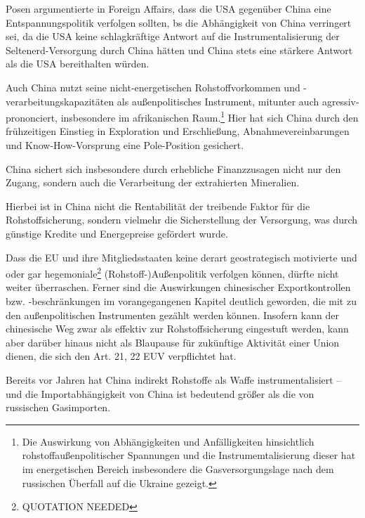 \documentclass[12pt,a4paper,oneside]{book} %
\begin{document}
{Posen argumentierte in Foreign Affairs, dass die USA gegenüber China eine Entspannungspolitik verfolgen sollten, bs die Abhängigkeit von China verringert sei, da die USA keine schlagkräftige Antwort auf die Instrumentalisierung der Seltenerd-Versorgung durch China hätten und China stets eine stärkere Antwort als die USA bereithalten würden.\autocite{https://www.foreignaffairs.com/united-states/tariffs-trade-wars-are-easy-lose}

Auch China nutzt seine nicht-energetischen Rohstoffvorkommen und -verarbeitungskapazitäten als außenpolitisches Instrument, mitunter auch agressiv-prononciert, insbesondere im afrikanischen Raum.\footnote{Die Auswirkung von Abhängigkeiten und Anfälligkeiten hinsichtlich rohstoffaußenpolitischer Spannungen und die Instrumemtalisierung dieser hat im energetischen Bereich insbesondere die Gasversorgungslage nach dem russischen Überfall auf die Ukraine gezeigt.} Hier hat sich China durch den frühzeitigen Einstieg in Exploration und Erschließung, Abnahmevereinbarungen und Know-How-Vorsprung eine \glqq Pole-Position \grqq gesichert.\autocite{https://www.africa-business-guide.de/de/praxis/erfahrungen/schluesselrolle-afrikas-bedeutung-bei-den-kritischen-rohstoffen--1920084}

China sichert sich insbesondere durch erhebliche Finanzzusagen nicht nur den Zugang, sondern auch die Verarbeitung der extrahierten Mineralien.

Hierbei ist in China nicht die Rentabilität der treibende Faktor für die Rohstoffsicherung, sondern vielmehr die Sicherstellung der Versorgung, was durch günstige Kredite und Energepreise gefördert wurde.\autocite{Oxford Analytica: Critical minerals will be a global faultline for years}


Dass die EU und ihre Mitgliedsstaaten keine derart geostrategisch motivierte und oder gar hegemoniale\footnote{QUOTATION NEEDED} (Rohstoff-)Außenpolitik verfolgen können, dürfte nicht weiter überraschen. Ferner sind die Auswirkungen chinesischer Exportkontrollen bzw. -beschränkungen im vorangegangenen Kapitel deutlich geworden, die mit zu den außenpolitischen Instrumenten gezählt werden können. Insofern kann der chinesische Weg zwar als effektiv zur Rohstoffsicherung eingestuft werden, kann aber darüber hinaus nicht als Blaupause für zukünftige Aktivität einer Union dienen, die sich den Art. 21, 22 EUV verpflichtet hat.

Bereits vor Jahren hat China indirekt Rohstoffe als Waffe instrumentalisiert -- und die Importabhängigkeit von China ist bedeutend größer als die von russischen Gasimporten.\autocite{BDI. Rohstoffkongress: Deutschland braucht eine strategische Rohstoffpolitik}

}
\end{document}

